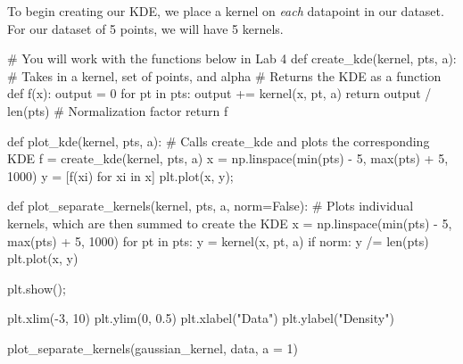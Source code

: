 \documentclass[
  letterpaper,
  DIV=11,
  numbers=noendperiod]{scrreprt}
\newenvironment{Shaded}{\begin{snugshade}}{\end{snugshade}}
\newcommand{\BuiltInTok}[1]{\textcolor[rgb]{0.00,0.23,0.31}{#1}}
\newcommand{\CommentTok}[1]{\textcolor[rgb]{0.37,0.37,0.37}{#1}}
\newcommand{\ControlFlowTok}[1]{\textcolor[rgb]{0.00,0.23,0.31}{#1}}
\newcommand{\DecValTok}[1]{\textcolor[rgb]{0.68,0.00,0.00}{#1}}
\newcommand{\FloatTok}[1]{\textcolor[rgb]{0.68,0.00,0.00}{#1}}
\newcommand{\KeywordTok}[1]{\textcolor[rgb]{0.00,0.23,0.31}{#1}}
\newcommand{\NormalTok}[1]{\textcolor[rgb]{0.00,0.23,0.31}{#1}}
\newcommand{\OperatorTok}[1]{\textcolor[rgb]{0.37,0.37,0.37}{#1}}
\newcommand{\StringTok}[1]{\textcolor[rgb]{0.13,0.47,0.30}{#1}}
\newcommand{\VariableTok}[1]{\textcolor[rgb]{0.07,0.07,0.07}{#1}}
\begin{document}
To begin creating our KDE, we place a kernel on \emph{each} datapoint in
our dataset. For our dataset of 5 points, we will have 5 kernels.

\begin{Shaded}
\begin{Highlighting}[]
\CommentTok{\# You will work with the functions below in Lab 4}
\KeywordTok{def}\NormalTok{ create\_kde(kernel, pts, a):}
    \CommentTok{\# Takes in a kernel, set of points, and alpha}
    \CommentTok{\# Returns the KDE as a function}
    \KeywordTok{def}\NormalTok{ f(x):}
\NormalTok{        output }\OperatorTok{=} \DecValTok{0}
        \ControlFlowTok{for}\NormalTok{ pt }\KeywordTok{in}\NormalTok{ pts:}
\NormalTok{            output }\OperatorTok{+=}\NormalTok{ kernel(x, pt, a)}
        \ControlFlowTok{return}\NormalTok{ output }\OperatorTok{/} \BuiltInTok{len}\NormalTok{(pts) }\CommentTok{\# Normalization factor}
    \ControlFlowTok{return}\NormalTok{ f}

\KeywordTok{def}\NormalTok{ plot\_kde(kernel, pts, a):}
    \CommentTok{\# Calls create\_kde and plots the corresponding KDE}
\NormalTok{    f }\OperatorTok{=}\NormalTok{ create\_kde(kernel, pts, a)}
\NormalTok{    x }\OperatorTok{=}\NormalTok{ np.linspace(}\BuiltInTok{min}\NormalTok{(pts) }\OperatorTok{{-}} \DecValTok{5}\NormalTok{, }\BuiltInTok{max}\NormalTok{(pts) }\OperatorTok{+} \DecValTok{5}\NormalTok{, }\DecValTok{1000}\NormalTok{)}
\NormalTok{    y }\OperatorTok{=}\NormalTok{ [f(xi) }\ControlFlowTok{for}\NormalTok{ xi }\KeywordTok{in}\NormalTok{ x]}
\NormalTok{    plt.plot(x, y)}\OperatorTok{;}
    
\KeywordTok{def}\NormalTok{ plot\_separate\_kernels(kernel, pts, a, norm}\OperatorTok{=}\VariableTok{False}\NormalTok{):}
    \CommentTok{\# Plots individual kernels, which are then summed to create the KDE}
\NormalTok{    x }\OperatorTok{=}\NormalTok{ np.linspace(}\BuiltInTok{min}\NormalTok{(pts) }\OperatorTok{{-}} \DecValTok{5}\NormalTok{, }\BuiltInTok{max}\NormalTok{(pts) }\OperatorTok{+} \DecValTok{5}\NormalTok{, }\DecValTok{1000}\NormalTok{)}
    \ControlFlowTok{for}\NormalTok{ pt }\KeywordTok{in}\NormalTok{ pts:}
\NormalTok{        y }\OperatorTok{=}\NormalTok{ kernel(x, pt, a)}
        \ControlFlowTok{if}\NormalTok{ norm:}
\NormalTok{            y }\OperatorTok{/=} \BuiltInTok{len}\NormalTok{(pts)}
\NormalTok{        plt.plot(x, y)}
    
\NormalTok{    plt.show()}\OperatorTok{;}
    
\NormalTok{plt.xlim(}\OperatorTok{{-}}\DecValTok{3}\NormalTok{, }\DecValTok{10}\NormalTok{)}
\NormalTok{plt.ylim(}\DecValTok{0}\NormalTok{, }\FloatTok{0.5}\NormalTok{)}
\NormalTok{plt.xlabel(}\StringTok{"Data"}\NormalTok{)}
\NormalTok{plt.ylabel(}\StringTok{"Density"}\NormalTok{)}

\NormalTok{plot\_separate\_kernels(gaussian\_kernel, data, a }\OperatorTok{=} \DecValTok{1}\NormalTok{)}
\end{Highlighting}
\end{Shaded}
\end{document}
